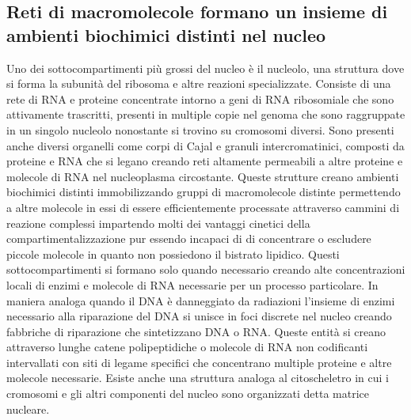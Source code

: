 \subsection{Reti di macromolecole formano un insieme di ambienti biochimici distinti nel nucleo}
Uno dei sottocompartimenti pi\`u grossi del nucleo \`e il nucleolo, una struttura dove si forma la subunit\`a del ribosoma e altre reazioni specializzate. Consiste di una rete di RNA e 
proteine concentrate intorno a geni di RNA ribosomiale che sono attivamente trascritti, presenti in multiple copie nel genoma che sono raggruppate in un singolo nucleolo nonostante si 
trovino su cromosomi diversi. Sono presenti anche diversi organelli come corpi di Cajal e granuli intercromatinici, composti da proteine e RNA che si legano creando reti altamente
permeabili a altre proteine e molecole di RNA nel nucleoplasma circostante. Queste strutture creano ambienti biochimici distinti immobilizzando gruppi di macromolecole distinte 
permettendo a altre molecole in essi di essere efficientemente processate attraverso cammini di reazione complessi impartendo molti dei vantaggi cinetici della compartimentalizzazione 
pur essendo incapaci di di concentrare o escludere piccole molecole in quanto non possiedono il bistrato lipidico. Questi sottocompartimenti si formano solo quando necessario creando 
alte concentrazioni locali di enzimi e molecole di RNA necessarie per un processo particolare. In maniera analoga quando il DNA \`e danneggiato da radiazioni l'insieme di enzimi 
necessario alla riparazione del DNA si unisce in foci discrete nel nucleo creando fabbriche di riparazione che sintetizzano DNA o RNA. Queste entit\`a si creano attraverso 
lunghe catene polipeptidiche o molecole di RNA non codificanti intervallati con siti di legame specifici che concentrano multiple proteine e altre molecole necessarie.  Esiste anche una
struttura analoga al citoscheletro in cui i cromosomi e gli altri componenti del nucleo sono organizzati detta matrice nucleare.
